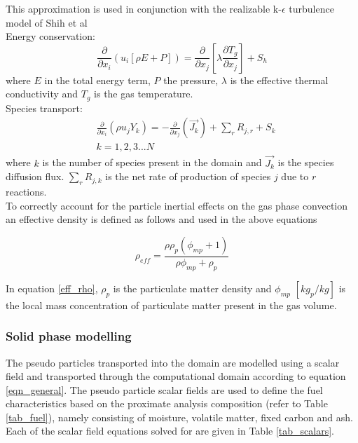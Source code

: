 \documentclass{webofc}
\begin{document}
This approximation is used in conjunction with the realizable k-$\epsilon$ turbulence model of Shih et al \cite{shih}\\

Energy conservation:
\begin{equation}\label{eqn_energy}
\frac{\partial }{\partial x_{i}} (u_{i}[\rho E+P])=\frac{\partial }{\partial x_{j}}\left[\lambda\frac{\partial T_{g}}{\partial x_{j}}\right] +S_{h}
\end{equation}
where $E$ in the total energy term, $P$ the pressure, $\lambda$ is the effective thermal conductivity and $T_g$ is the gas temperature.\\

Species transport:
\begin{equation}\label{eqn_species}
\begin{split}
&\frac{\partial}{\partial x_{i}}(\rho u_{j}Y_{k})=-\frac{\partial}{\partial x_{j}}(\vec{J_{k}})+ \sum_r R_{j,r} + S_{k}\\
&k = 1,2,3...N
\end{split}
\end{equation}
where $k$ is the number of species present in the domain and $\vec{J_{k}}$ is the species diffusion flux. $\sum_r R_{j,k}$ is the net rate of production of species $j$ due to $r$ reactions.\\

To correctly account for the particle inertial effects on the gas phase convection an effective density is defined as follows and used in the above equations

\begin{equation} \label{eff_rho}
	\rho_{eff} = \frac{\rho \rho_p \left( \phi_{mp} + 1 \right)}{\rho \phi_{mp} + \rho_p}
\end{equation}

In equation \eqref{eff_rho}, $\rho_p$ is the particulate matter density and $\phi_{mp}$ $[kg_p/kg]$ is the local mass concentration of particulate matter present in the gas volume. 

\subsubsection{Solid phase modelling}
The pseudo particles transported into the domain are modelled using a scalar field and transported through the computational domain according to equation \ref{eqn_general}. The pseudo particle scalar fields are used to define the fuel characteristics based on the proximate analysis composition (refer to Table \ref{tab_fuel}), namely consisting of moisture, volatile matter, fixed  carbon and ash. Each of the scalar field equations solved for are given in Table \ref{tab_scalars}.\\
\end{document}
